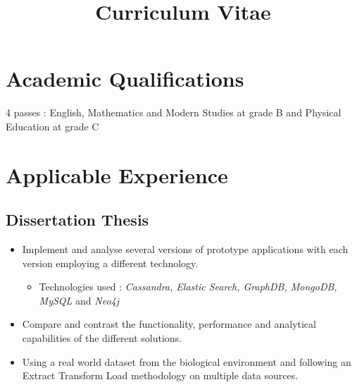 \documentclass[11pt,a4paper,sans]{moderncv}
\title{Curriculum Vitae}            \address{20 Gardrum Gardens, Shieldhill}{Falkirk, FK1 2TB }{Scotland}
\begin{document}
\makecvtitle

\section{Academic Qualifications}
4 passes : English, Mathematics and Modern Studies at grade B and Physical Education at grade C
\section{Applicable Experience}
\subsection{Dissertation Thesis}
\begin{itemize}
\item Implement and analyse several versions of prototype applications with each version employing a different technology.
\begin{itemize}
\item Technologies used : \textit{Cassandra, Elastic Search, GraphDB, MongoDB, MySQL} and \textit{Neo4j}
\end{itemize}
\item Compare and contrast the functionality, performance and analytical capabilities of the different solutions.
\item Using a real world dataset from the biological environment and following an Extract Transform Load methodology on multiple data sources.
\end{itemize}
\end{document}
